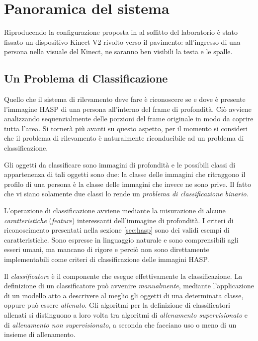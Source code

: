 
\chapter{Panoramica del sistema}
\label{cap:overview}
Riproducendo la configurazione proposta in \cite{Zhu13} al soffitto del laboratorio è stato fissato un dispositivo Kinect V2 rivolto verso il pavimento: all'ingresso di una persona nella visuale del Kinect, ne saranno ben visibili la testa e le spalle.


\section{Un Problema di Classificazione}
\label{sec:classification_problem}
Quello che il sistema di rilevamento deve fare è riconoscere se e dove è presente l'immagine HASP di una persona all'interno del frame di profondità.
Ciò avviene analizzando sequenzialmente delle porzioni del frame originale in modo da coprire tutta l'area. Si tornerà più avanti su questo aspetto, per il momento si consideri che il problema di rilevamento è naturalmente riconducibile ad un problema di classificazione.

Gli oggetti da classificare sono immagini di profondità e le possibili classi di appartenenza di tali oggetti sono due: la classe delle immagini che ritraggono il profilo di una persona è la classe delle immagini che invece ne sono prive.
Il fatto che vi siano solamente due classi lo rende un \emph{problema di classificazione binario}.

L'operazione di classificazione avviene mediante la misurazione di alcune \emph{caratteristiche} (\emph{feature}) interessanti dell'immagine di profondità.
I criteri di riconoscimento presentati nella sezione \ref{sec:hasp} sono dei validi esempi di caratteristiche. Sono espresse in linguaggio naturale e sono comprensibili agli esseri umani, ma mancano di rigore e perciò non sono direttamente implementabili come criteri di classificazione delle immagini HASP.

Il \emph{classificatore} è il componente che esegue effettivamente la classificazione. La definizione di un classificatore può avvenire \emph{manualmente}, mediante l'applicazione di un modello atto a descrivere al meglio gli oggetti di una determinata classe, oppure può essere \emph{allenato}.
Gli algoritmi per la definizione di classificatori allenati si distinguono a loro volta tra algoritmi di \emph{allenamento supervisionato} e di \emph{allenamento non supervisionato}, a seconda che facciano uso o meno di un insieme di allenamento.

